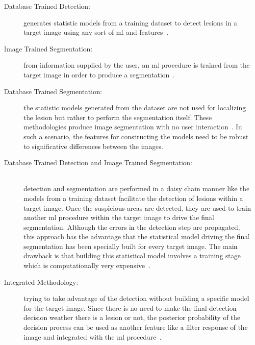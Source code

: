 \documentclass[authoryear,preprint,review,12pt]{elsarticle}
\begin{document}
\begin{description}
\item[Database Trained Detection:] generates statistic models from a training dataset to detect lesions in a target image using any sort of \ac{ml} and features~\cite{massich2010lesion,massich2011seed,massich2012seed,Madabhushi:2003p6036,Zhang:2010p14317,Jiang:2012p14354,hao2012combining}.
\item[Image Trained Segmentation:] from information supplied by the user, an \ac{ml} procedure is trained from the target image in order to produce a segmentation~\cite{Xiao:2002p5639,gerard2013}.
\item[Database Trained Segmentation:] the statistic models generated from the dataset are not used for localizing the lesion but rather to perform the segmentation itself. These methodologies produce image segmentation with no user interaction~\cite{Liu:2010p12036,Shan:2012p14347}. In such a scenario, the features for constructing the models need to be robust to significative differences between the images.
\item[Database Trained Detection and Image Trained Segmentation:]  
 \hfill \\
detection and segmentation are performed in a daisy chain manner like the models from a training dataset facilitate the detection of lesions within a target image. Once the suspicious areas are detected, they are used to train another \ac{ml} procedure within the target image to drive the final segmentation. Although the errors in the detection step are propagated,  this approach has the advantage that the statistical model driving the final segmentation has been specially built for every target image. The main drawback is that building this statistical model involves a training stage which is computationally very expensive~\cite{Zhang:2010p14317,Jiang:2012p14354}.
\item[Integrated Methodology:]  trying to take advantage of the detection without building a specific model for the target image. Since there is no need to make the final detection decision weather there is a lesion or not, the posterior probability of the decision process can be used as another feature like a filter response of the image and integrated with the \ac{ml} procedure~\cite{hao2012combining}.
\end{description}
\end{document}
